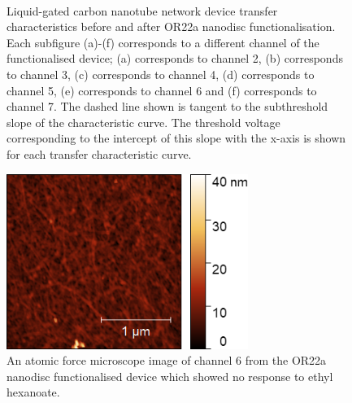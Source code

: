 \documentclass[
  a4paper,
]{scrbook}
\begin{document}
\begin{figure}
\begin{minipage}[t]{0.45\linewidth}
{{}

}

\end{minipage}%
%
\begin{minipage}[t]{0.01\linewidth}

{\centering 

~

}

\end{minipage}%

\caption{\label{fig-OR22a-variability-TX}Liquid-gated carbon nanotube
network device transfer characteristics before and after OR22a nanodisc
functionalisation. Each subfigure (a)-(f) corresponds to a different
channel of the functionalised device; (a) corresponds to channel 2, (b)
corresponds to channel 3, (c) corresponds to channel 4, (d) corresponds
to channel 5, (e) corresponds to channel 6 and (f) corresponds to
channel 7. The dashed line shown is tangent to the subthreshold slope of
the characteristic curve. The threshold voltage corresponding to the
intercept of this slope with the x-axis is shown for each transfer
characteristic curve.}

\end{figure}

\begin{figure}

{\centering \includegraphics[width=0.7\textwidth,height=\textheight]{figures/ch8/Q4C4_CH6_PostSensing_OR22a_Func_AFM100670_00693.png}

}

\caption{\label{fig-OR22a-variability-AFM}An atomic force microscope
image of channel 6 from the OR22a nanodisc functionalised device which
showed no response to ethyl hexanoate.}

\end{figure}
\end{document}
